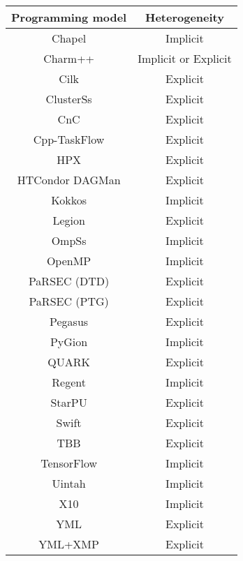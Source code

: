\begin{tabular}{cc}
\hline
Programming model & Heterogeneity \\
\hline
Chapel & Implicit\\
Charm++ & Implicit or Explicit\\
Cilk & Explicit\\
ClusterSs & Explicit\\
CnC & Explicit\\
Cpp-TaskFlow & Explicit\\
HPX & Explicit\\
HTCondor DAGMan & Explicit\\
Kokkos & Implicit\\
Legion & Explicit\\
OmpSs & Implicit\\
OpenMP & Implicit\\
PaRSEC (DTD) & Explicit\\
PaRSEC (PTG) & Explicit\\
Pegasus & Explicit\\
PyGion & Implicit\\
QUARK & Explicit\\
Regent & Implicit\\
StarPU & Explicit\\
Swift & Explicit\\
TBB & Explicit\\
TensorFlow & Implicit\\
Uintah & Implicit\\
X10 & Implicit\\
YML & Explicit\\
YML+XMP & Explicit\\
\hline
\end{tabular}
